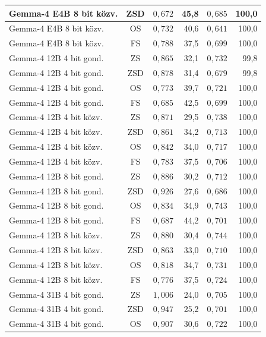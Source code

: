 \documentclass[
]{elteikthesis}[2024/04/26]
\begin{document}
\begin{longtable}{ | l | c | r | r | r | r | }
	\hline
	Gemma-4 E4B 8 bit közv. & ZSD & $0{,}672$ & 45,8 & $0{,}685$ & 100,0 \\
	\hline
	Gemma-4 E4B 8 bit közv. & OS & $0{,}732$ & 40,6 & $0{,}641$ & 100,0 \\
	\hline
	Gemma-4 E4B 8 bit közv. & FS & $0{,}788$ & 37,5 & $0{,}699$ & 100,0 \\
	\hline
	Gemma-4 12B 4 bit gond. & ZS & $0{,}865$ & 32,1 & $0{,}732$ & 99,8 \\
	\hline
	Gemma-4 12B 4 bit gond. & ZSD & $0{,}878$ & 31,4 & $0{,}679$ & 99,8 \\
	\hline
	Gemma-4 12B 4 bit gond. & OS & $0{,}773$ & 39,7 & $0{,}721$ & 100,0 \\
	\hline
	Gemma-4 12B 4 bit gond. & FS & $0{,}685$ & 42,5 & $0{,}699$ & 100,0 \\
	\hline
	Gemma-4 12B 4 bit közv. & ZS & $0{,}871$ & 29,5 & $0{,}738$ & 100,0 \\
	\hline
	Gemma-4 12B 4 bit közv. & ZSD & $0{,}861$ & 34,2 & $0{,}713$ & 100,0 \\
	\hline
	Gemma-4 12B 4 bit közv. & OS & $0{,}842$ & 34,0 & $0{,}717$ & 100,0 \\
	\hline
	Gemma-4 12B 4 bit közv. & FS & $0{,}783$ & 37,5 & $0{,}706$ & 100,0 \\
	\hline
	Gemma-4 12B 8 bit gond. & ZS & $0{,}886$ & 30,2 & $0{,}712$ & 100,0 \\
	\hline
	Gemma-4 12B 8 bit gond. & ZSD & $0{,}926$ & 27,6 & $0{,}686$ & 100,0 \\
	\hline
	Gemma-4 12B 8 bit gond. & OS & $0{,}834$ & 34,9 & $0{,}743$ & 100,0 \\
	\hline
	Gemma-4 12B 8 bit gond. & FS & $0{,}687$ & 44,2 & $0{,}701$ & 100,0 \\
	\hline
	Gemma-4 12B 8 bit közv. & ZS & $0{,}880$ & 30,4 & $0{,}744$ & 100,0 \\
	\hline
	Gemma-4 12B 8 bit közv. & ZSD & $0{,}863$ & 33,0 & $0{,}710$ & 100,0 \\
	\hline
	Gemma-4 12B 8 bit közv. & OS & $0{,}818$ & 34,7 & $0{,}731$ & 100,0 \\
	\hline
	Gemma-4 12B 8 bit közv. & FS & $0{,}776$ & 37,5 & $0{,}724$ & 100,0 \\
	\hline
	Gemma-4 31B 4 bit gond. & ZS & $1{,}006$ & 24,0 & $0{,}705$ & 100,0 \\
	\hline
	Gemma-4 31B 4 bit gond. & ZSD & $0{,}947$ & 25,2 & $0{,}701$ & 100,0 \\
	\hline
	Gemma-4 31B 4 bit gond. & OS & $0{,}907$ & 30,6 & $0{,}722$ & 100,0 \\

\end{longtable}
\end{document}
